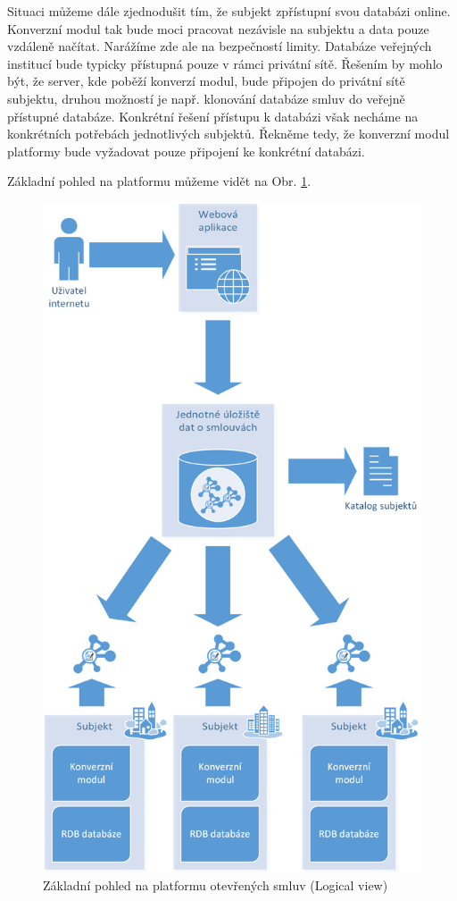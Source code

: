 Situaci můžeme dále zjednodušit tím, že subjekt zpřístupní svou databázi online. Konverzní modul tak bude moci pracovat nezávisle na subjektu a data pouze vzdáleně načítat. Narážíme zde ale na bezpečností limity. Databáze veřejných institucí bude typicky přístupná pouze v rámci privátní sítě. Řešením by mohlo být, že server, kde poběží konverzí modul, bude připojen do privátní sítě subjektu, druhou možností je např. klonování databáze smluv do veřejně přístupné databáze. Konkrétní řešení přístupu k databázi však necháme na konkrétních potřebách jednotlivých subjektů. Řekněme tedy, že konverzní modul platformy bude vyžadovat pouze připojení ke konkrétní databázi.

Základní pohled na platformu můžeme vidět na Obr. \ref{obr:logicalView}.

\begin{figure}[H]
\centerline{\includegraphics[width=135mm]{img/logicalView.eps}}
\caption{Základní pohled na platformu otevřených smluv (Logical view)}
\label{obr:logicalView}
\end{figure}

